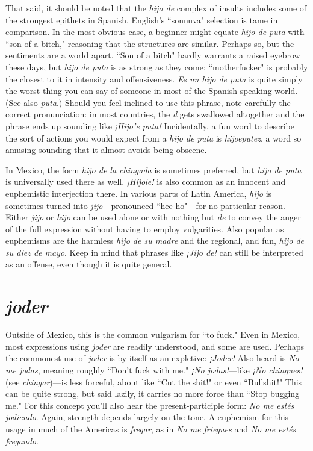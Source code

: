 That said, it should be noted that the \emph{hijo de} complex of insults includes some of the strongest epithets in Spanish. English's
``sonnuva" selection is tame in comparison. In the most obvious case,
a beginner might equate \emph{hijo de puta} with ``son of a bitch," reasoning
that the structures are similar. Perhaps so, but the sentiments are a
world apart. ``Son of a bitch" hardly warrants a raised eyebrow these
days, but \emph{hijo de puta} is as strong as they come: ``motherfucker" is
probably the closest to it in intensity and offensiveness. \emph{Es un hijo de
puta} is quite simply the worst thing you can say of someone in most of
the Spanish-speaking world. (See also \emph{puta}.) Should you feel inclined
to use this phrase, note carefully the correct pronunciation: in most
countries, the \emph{d} gets swallowed altogether and the phrase ends up sounding like \emph{¡Hijo'e puta!} Incidentally, a fun word to describe the sort of
actions you would expect from a \emph{hijo de puta} is \emph{hijoeputez}, a word so
amusing-sounding that it almost avoids being obscene.

In Mexico, the form \emph{hijo de la chingada} is sometimes preferred, but \emph{hijo de puta} is universally used there as well. \emph{¡Híjole!} is
also common as an innocent and euphemistic interjection there. In
various parts of Latin America, \emph{hijo} is sometimes turned into \emph{jijo}---pronounced ``hee-ho"---for no particular reason. Either \emph{jijo} or \emph{hijo} can
be used alone or with nothing but \emph{de} to convey the anger of the full
expression without having to employ vulgarities. Also popular as euphemisms are the harmless \emph{hijo de su madre} and the regional, and fun,
\emph{hijo de su diez de mayo}. Keep in mind that phrases like \emph{¡Jijo de!} can
still be interpreted as an offense, even though it is quite general.

\section{\emph{joder}}

Outside of Mexico, this is the common vulgarism for ``to
fuck." Even in Mexico, most expressions using \emph{joder} are readily understood, and some are used. Perhaps the commonest use of \emph{joder} is by
itself as an expletive: \emph{¡Joder!} Also heard is \emph{No me jodas}, meaning
roughly ``Don't fuck with me." \emph{¡No jodas!}---like \emph{¡No chingues!} (see
\emph{chingar})---is less forceful, about like ``Cut the shit!" or even ``Bullshit!" This can be quite strong, but said lazily, it carries no more force
than ``Stop bugging me." For this concept you'll also hear the present-participle form: \emph{No me estés jodiendo}. Again, strength depends largely
on the tone. A euphemism for this usage in much of the Americas is
\emph{fregar}, as in \emph{No me friegues} and \emph{No me estés fregando}.

